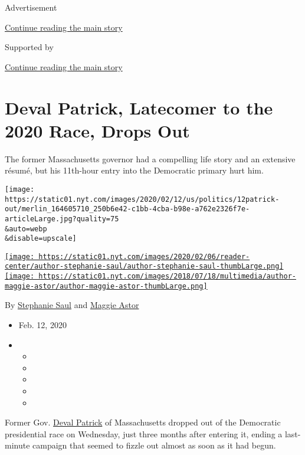 Advertisement

\protect\hyperlink{after-top}{Continue reading the main story}

Supported by

\protect\hyperlink{after-sponsor}{Continue reading the main story}

\hypertarget{deval-patrick-latecomer-to-the-2020-race-drops-out}{%
\section{Deval Patrick, Latecomer to the 2020 Race, Drops
Out}\label{deval-patrick-latecomer-to-the-2020-race-drops-out}}

The former Massachusetts governor had a compelling life story and an
extensive résumé, but his 11th-hour entry into the Democratic primary
hurt him.

\texttt{[image: https://static01.nyt.com/images/2020/02/12/us/politics/12patrick-out/merlin\_164605710\_250b6e42-c1bb-4cba-b98e-a762e2326f7e-articleLarge.jpg?quality=75\\\&auto=webp\\\&disable=upscale]}

\href{https://www.nytimes.com/by/stephanie-saul}{\texttt{[image: https://static01.nyt.com/images/2020/02/06/reader-center/author-stephanie-saul/author-stephanie-saul-thumbLarge.png]}}\href{https://www.nytimes.com/by/maggie-astor}{\texttt{[image: https://static01.nyt.com/images/2018/07/18/multimedia/author-maggie-astor/author-maggie-astor-thumbLarge.png]}}

By \href{https://www.nytimes.com/by/stephanie-saul}{Stephanie Saul} and
\href{https://www.nytimes.com/by/maggie-astor}{Maggie Astor}

\begin{itemize}
\item
  Feb. 12, 2020
\item
  \begin{itemize}
  \item
  \item
  \item
  \item
  \item
  \end{itemize}
\end{itemize}

Former Gov.
\href{https://www.nytimes.com/interactive/2020/us/elections/deval-patrick.html}{Deval
Patrick} of Massachusetts dropped out of the Democratic presidential
race on Wednesday, just three months after entering it, ending a
last-minute campaign that seemed to fizzle out almost as soon as it had
begun.

